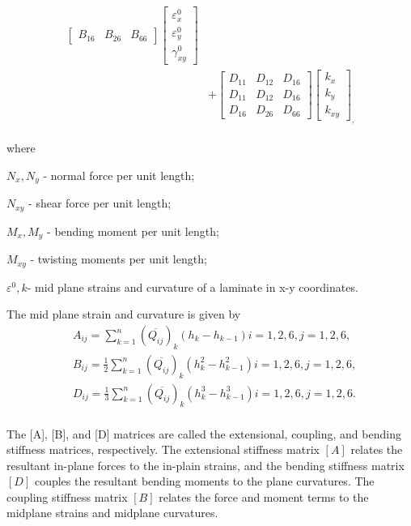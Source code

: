 \begin{equation}
\begin{array}{l}
\begin{aligned}
\begin{bmatrix}
		B_{16} & B_{26} & B_{66} 
	\end{bmatrix}
    \begin{bmatrix}
		\varepsilon_x^0 \\
        \varepsilon_y^0 \\
		\gamma_{xy}^0
    \end{bmatrix} \\ 
	&+  
	\begin{bmatrix}
		D_{11} & D_{12} & D_{16} \\
		D_{11} & D_{12} & D_{16} \\
		D_{16} & D_{26} & D_{66} 
	\end{bmatrix}
	\begin{bmatrix}
		k_x \\
		k_y \\
		k_{xy} 
	\end{bmatrix}_{\textstyle,}
\end{aligned}
	\end{array}
\end{equation}

where

$N_x,N_y $  - normal force per unit length;

$N_{xy} $  - shear force per unit length;

$M_x, M_y $ - bending moment per unit length;

$M_{xy} $  - twisting moments per unit length;

$\varepsilon^{0}, k $- mid plane strains and curvature of a laminate in x-y
coordinates.

The mid plane strain and curvature is given by
\begin{equation}
    \begin{split}
    &A_{ij}=\sum_{k=1}^{n}(\overline{Q_{ij}})_k(h_k-h_{k-1})  i=1,2,6, j=1,2,6,\\
    &B_{ij}=\frac{1}{2}\sum_{k=1}^{n}(\overline{Q_{ij}})_k(h_k^2 - h_{k-1}^2)
	i=1,2,6, j=1,2,6,\\
    &D_{ij}=\frac{1}{3}\sum_{k=1}^{n}(\overline{Q_{ij}})_k(h_k^3 - h_{k-1}^3)
	i=1,2,6, j=1,2,6.\\
    \end{split}
\end{equation}

The [A], [B], and [D] matrices are called the extensional, coupling, and bending stiffness matrices,
respectively. The extensional stiffness matrix $[A]$ relates the resultant in-plane forces to the
in-plain strains, and the bending stiffness matrix $[D]$ couples the resultant bending moments to
the plane curvatures.  The coupling stiffness matrix $[B]$ relates the force and moment terms to the
midplane strains and midplane curvatures.
